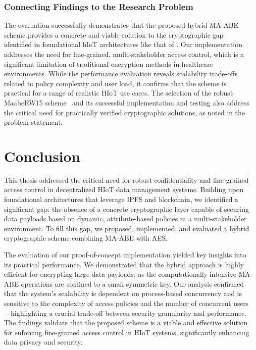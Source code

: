 \documentclass[cic,tc,english]{iiufrgs}
\numberwithin{algorithm}{chapter}
\begin{document}
            \subsection{Connecting Findings to the Research Problem}

                The evaluation successfully demonstrates that the proposed hybrid MA-ABE scheme provides a concrete and viable solution to the cryptographic gap identified in foundational hIoT architectures like that of \citet{laura2023}. Our implementation addresses the need for fine-grained, multi-stakeholder access control, which is a significant limitation of traditional encryption methods in healthcare environments. While the performance evaluation reveals scalability trade-offs related to policy complexity and user load, it confirms that the scheme is practical for a range of realistic HIoT use cases. The selection of the robust MaabeRW15 scheme~\citep{rouselakis2015efficient} and its successful implementation and testing also address the critical need for practically verified cryptographic solutions, as noted in the problem statement.


\chapter{Conclusion}
    \label{chap:conclusion}

    This thesis addressed the critical need for robust confidentiality and fine-grained access control in decentralized HIoT data management systems. Building upon foundational architectures that leverage IPFS and blockchain, we identified a significant gap: the absence of a concrete cryptographic layer capable of securing data payloads based on dynamic, attribute-based policies in a multi-stakeholder environment. To fill this gap, we proposed, implemented, and evaluated a hybrid cryptographic scheme combining MA-ABE with AES.

    The evaluation of our proof-of-concept implementation yielded key insights into its practical performance. We demonstrated that the hybrid approach is highly efficient for encrypting large data payloads, as the computationally intensive MA-ABE operations are confined to a small symmetric key. Our analysis confirmed that the system's scalability is dependent on process-based concurrency and is sensitive to the complexity of access policies and the number of concurrent users—highlighting a crucial trade-off between security granularity and performance. The findings validate that the proposed scheme is a viable and effective solution for enforcing fine-grained access control in HIoT systems, significantly enhancing data privacy and security.
\end{document}
